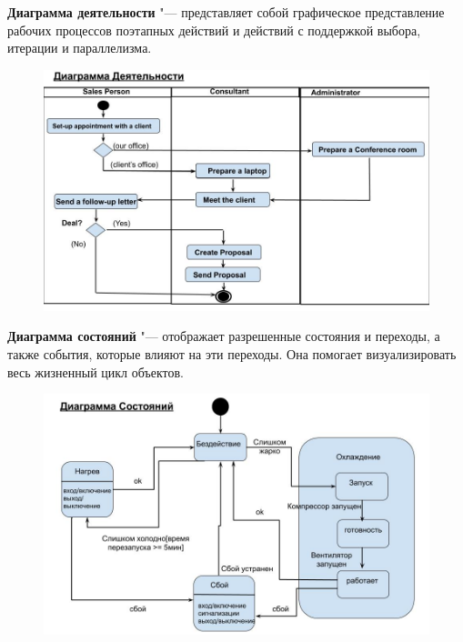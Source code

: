 \documentclass[bachelor, och, pract]{SCWorks}
\theoremstyle{remark}
\begin{document}
    \newpage
    \textbf{Диаграмма деятельности} "--- представляет собой графическое представление рабочих процессов поэтапных действий и действий с поддержкой выбора, итерации и параллелизма.
    
    \begin{figure}[H]
        \begin{center}
            \includegraphics[scale=0.5]{res/activity-diagram.png}
        \end{center}
    \end{figure}
    
    \newpage
    \textbf{Диаграмма состояний} "--- отображает разрешенные состояния и переходы, а также события, которые влияют на эти переходы. Она помогает визуализировать весь жизненный цикл объектов.
    
    \begin{figure}[H]
        \begin{center}
            \includegraphics[scale=0.5]{res/state-diagram.png}
        \end{center}
    \end{figure}
\end{document}
